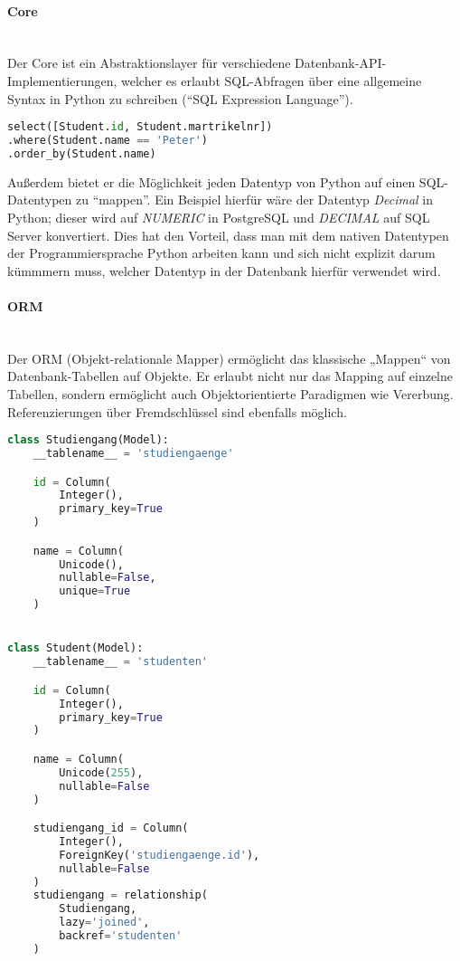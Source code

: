 \paragraph{Core} \hspace{0pt} \\
Der Core ist ein Abstraktionslayer für verschiedene Datenbank-API-Implementierungen, welcher es erlaubt SQL-Abfragen über eine allgemeine Syntax in Python zu schreiben ("`SQL Expression Language"').

\begin{lstlisting}[language=Python]
select([Student.id, Student.martrikelnr])
.where(Student.name == 'Peter')
.order_by(Student.name)
\end{lstlisting}

\hspace{0pt}

\noindent
Außerdem bietet er die Möglichkeit jeden Datentyp von Python auf einen SQL-Datentypen zu "`mappen"'. Ein Beispiel hierfür wäre der Datentyp \textit{Decimal} in Python; dieser wird auf \textit{NUMERIC} in PostgreSQL und \textit{DECIMAL} auf SQL Server konvertiert. Dies hat den Vorteil, dass man mit dem nativen Datentypen der Programmiersprache Python arbeiten kann und sich nicht explizit darum kümmmern muss, welcher Datentyp in der Datenbank hierfür verwendet wird.

\paragraph{ORM} \hspace{0pt} \\
Der ORM (Objekt-relationale Mapper) ermöglicht das klassische „Mappen“ von Datenbank-Tabellen auf Objekte. Er erlaubt nicht nur das Mapping auf einzelne Tabellen, sondern ermöglicht auch Objektorientierte Paradigmen wie Vererbung. Referenzierungen über Fremdschlüssel sind ebenfalls möglich.

\begin{lstlisting}[language=Python]
class Studiengang(Model):
    __tablename__ = 'studiengaenge'

    id = Column(
        Integer(),
        primary_key=True
    )

    name = Column(
        Unicode(),
        nullable=False,
        unique=True
    )


class Student(Model):
    __tablename__ = 'studenten'

    id = Column(
        Integer(),
        primary_key=True
    )

    name = Column(
        Unicode(255),
        nullable=False
    )

    studiengang_id = Column(
        Integer(),
        ForeignKey('studiengaenge.id'),
        nullable=False
    )
    studiengang = relationship(
        Studiengang,
        lazy='joined',
        backref='studenten'
    )
\end{lstlisting}


